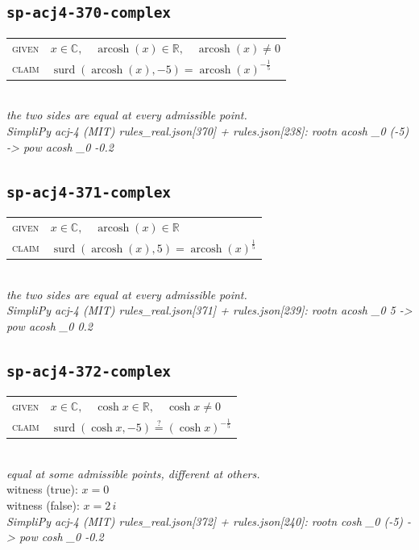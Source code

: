 \documentclass[11pt]{article}
\begin{document}
\subsection*{\texttt{sp-acj4-370-complex}}
\begin{tabular}{@{}l@{\quad}l@{}}
\textsc{given} & $x \in \mathbb{C},\quad \operatorname{arcosh}\left(x\right) \in \mathbb{R},\quad \operatorname{arcosh}\left(x\right) \neq 0$ \\[4pt]
\textsc{claim} & $\displaystyle \operatorname{surd}\left(\operatorname{arcosh}\left(x\right), -5\right) = \operatorname{arcosh}\left(x\right)^{-\frac{1}{5}}$ \\
\end{tabular}\\[2pt]
{\small\emph{the two sides are equal at every admissible point.}}\\
\emph{SimpliPy acj-4 (MIT) rules\_real.json[370] + rules.json[238]: rootn acosh \_0 (-5)  ->  pow acosh \_0 -0.2}\\

\subsection*{\texttt{sp-acj4-371-complex}}
\begin{tabular}{@{}l@{\quad}l@{}}
\textsc{given} & $x \in \mathbb{C},\quad \operatorname{arcosh}\left(x\right) \in \mathbb{R}$ \\[4pt]
\textsc{claim} & $\displaystyle \operatorname{surd}\left(\operatorname{arcosh}\left(x\right), 5\right) = \operatorname{arcosh}\left(x\right)^{\frac{1}{5}}$ \\
\end{tabular}\\[2pt]
{\small\emph{the two sides are equal at every admissible point.}}\\
\emph{SimpliPy acj-4 (MIT) rules\_real.json[371] + rules.json[239]: rootn acosh \_0 5  ->  pow acosh \_0 0.2}\\

\subsection*{\texttt{sp-acj4-372-complex}}
\begin{tabular}{@{}l@{\quad}l@{}}
\textsc{given} & $x \in \mathbb{C},\quad \cosh x \in \mathbb{R},\quad \cosh x \neq 0$ \\[4pt]
\textsc{claim} & $\displaystyle \operatorname{surd}\left(\cosh x, -5\right) \overset{?}{=} \left(\cosh x\right)^{-\frac{1}{5}}$ \\
\end{tabular}\\[2pt]
{\small\emph{equal at some admissible points, different at others.}}\\
{\footnotesize\color{gray}witness (true): $x = 0$}\\
{\footnotesize\color{gray}witness (false): $x = 2 \, i$}\\
\emph{SimpliPy acj-4 (MIT) rules\_real.json[372] + rules.json[240]: rootn cosh \_0 (-5)  ->  pow cosh \_0 -0.2}\\
\end{document}
